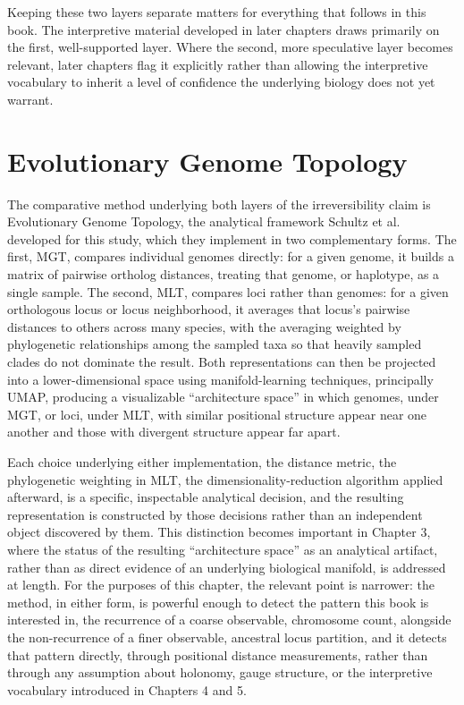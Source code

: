 \documentclass[11pt]{book}
\begin{document}
Keeping these two layers separate matters for everything that follows in this book. The interpretive material developed in later chapters draws primarily on the first, well-supported layer. Where the second, more speculative layer becomes relevant, later chapters flag it explicitly rather than allowing the interpretive vocabulary to inherit a level of confidence the underlying biology does not yet warrant.

\section{Evolutionary Genome Topology}

The comparative method underlying both layers of the irreversibility claim is Evolutionary Genome Topology, the analytical framework Schultz et al. developed for this study, which they implement in two complementary forms. The first, MGT, compares individual genomes directly: for a given genome, it builds a matrix of pairwise ortholog distances, treating that genome, or haplotype, as a single sample. The second, MLT, compares loci rather than genomes: for a given orthologous locus or locus neighborhood, it averages that locus's pairwise distances to others across many species, with the averaging weighted by phylogenetic relationships among the sampled taxa so that heavily sampled clades do not dominate the result. Both representations can then be projected into a lower-dimensional space using manifold-learning techniques, principally UMAP, producing a visualizable ``architecture space'' in which genomes, under MGT, or loci, under MLT, with similar positional structure appear near one another and those with divergent structure appear far apart.

Each choice underlying either implementation, the distance metric, the phylogenetic weighting in MLT, the dimensionality-reduction algorithm applied afterward, is a specific, inspectable analytical decision, and the resulting representation is constructed by those decisions rather than an independent object discovered by them. This distinction becomes important in Chapter 3, where the status of the resulting ``architecture space'' as an analytical artifact, rather than as direct evidence of an underlying biological manifold, is addressed at length. For the purposes of this chapter, the relevant point is narrower: the method, in either form, is powerful enough to detect the pattern this book is interested in, the recurrence of a coarse observable, chromosome count, alongside the non-recurrence of a finer observable, ancestral locus partition, and it detects that pattern directly, through positional distance measurements, rather than through any assumption about holonomy, gauge structure, or the interpretive vocabulary introduced in Chapters 4 and 5.
\end{document}
